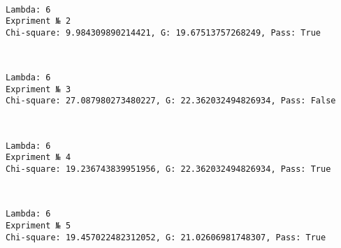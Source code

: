 \documentclass[11pt]{article}
\begin{document}
    \begin{center}
    \end{center}
    { \hspace*{\fill} \\}
    
    \begin{Verbatim}[commandchars=\\\{\}]
Lambda: 6
Expriment № 2
Chi-square: 9.984309890214421, G: 19.67513757268249, Pass: True
    \end{Verbatim}

    \begin{center}
    \end{center}
    { \hspace*{\fill} \\}
    
    \begin{Verbatim}[commandchars=\\\{\}]
Lambda: 6
Expriment № 3
Chi-square: 27.087980273480227, G: 22.362032494826934, Pass: False
    \end{Verbatim}

    \begin{center}
    \end{center}
    { \hspace*{\fill} \\}
    
    \begin{Verbatim}[commandchars=\\\{\}]
Lambda: 6
Expriment № 4
Chi-square: 19.236743839951956, G: 22.362032494826934, Pass: True
    \end{Verbatim}

    \begin{center}
    \end{center}
    { \hspace*{\fill} \\}
    
    \begin{Verbatim}[commandchars=\\\{\}]
Lambda: 6
Expriment № 5
Chi-square: 19.457022482312052, G: 21.02606981748307, Pass: True
    \end{Verbatim}
\end{document}
